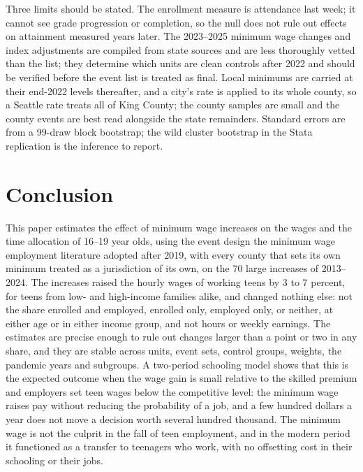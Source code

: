 \documentclass[12pt]{article}
\begin{document}
Three limits should be stated. The enrollment measure is attendance last week; it cannot see grade progression or completion, so the null does not rule out effects on attainment measured years later. The 2023--2025 minimum wage changes and index adjustments are compiled from state sources and are less thoroughly vetted than the \citet{vaghul2016} list; they determine which units are clean controls after 2022 and should be verified before the event list is treated as final. Local minimums are carried at their end-2022 levels thereafter, and a city's rate is applied to its whole county, so a Seattle rate treats all of King County; the county samples are small and the county events are best read alongside the state remainders. Standard errors are from a 99-draw block bootstrap; the wild cluster bootstrap in the Stata replication is the inference to report.

\section{Conclusion}\label{sec:conclusion}

This paper estimates the effect of minimum wage increases on the wages and the time allocation of 16--19 year olds, using the event design the minimum wage employment literature adopted after 2019, with every county that sets its own minimum treated as a jurisdiction of its own, on the 70 large increases of 2013--2024. The increases raised the hourly wages of working teens by 3 to 7 percent, for teens from low- and high-income families alike, and changed nothing else: not the share enrolled and employed, enrolled only, employed only, or neither, at either age or in either income group, and not hours or weekly earnings. The estimates are precise enough to rule out changes larger than a point or two in any share, and they are stable across units, event sets, control groups, weights, the pandemic years and subgroups. A two-period schooling model shows that this is the expected outcome when the wage gain is small relative to the skilled premium and employers set teen wages below the competitive level: the minimum wage raises pay without reducing the probability of a job, and a few hundred dollars a year does not move a decision worth several hundred thousand. The minimum wage is not the culprit in the fall of teen employment, and in the modern period it functioned as a transfer to teenagers who work, with no offsetting cost in their schooling or their jobs.
\end{document}
